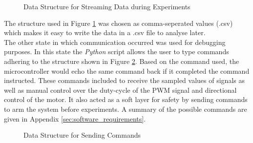 \begin{figure}[h]
	\centering
	
	\caption{Data Structure for Streaming Data during Experiments}
	\label{fig:data_struct}
\end{figure}

The structure used in Figure \ref{fig:data_struct} was chosen as comma-seperated values (.csv) which makes it easy to write the data in a .csv file to analyse later.\\

The other state in which communication occurred was used for debugging purposes. In this state the \textit{Python} script allows the user to type commands adhering to the structure shown in Figure \ref{fig:uart_struct}. Based on the command used, the microcontroller would echo the same command back if it completed the command instructed. These commands included to receive the sampled values of signals as well as manual control over the duty-cycle of the PWM signal and directional control of the motor. It also acted as a soft layer for safety by sending commands to arm the system before experiments. A summary of the possible commands are given in Appendix \ref{sec:software_requirements}.


\begin{figure}[h]
	\centering
	
	\caption{Data Structure for Sending Commands}
	\label{fig:uart_struct}
\end{figure}


